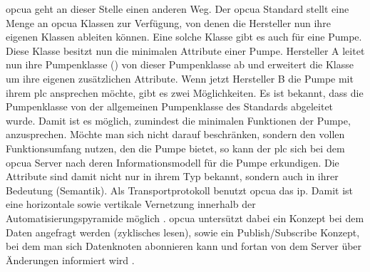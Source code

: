 \ac{opcua} geht an dieser Stelle einen anderen Weg. 
Der \ac{opcua} Standard stellt eine Menge an \ac{opcua} Klassen zur Verfügung, 
von denen die Hersteller nun ihre eigenen Klassen ableiten können.
Eine solche Klasse gibt es auch für eine Pumpe. Diese Klasse besitzt nun die minimalen Attribute einer Pumpe.
Hersteller A leitet nun ihre Pumpenklasse () von dieser Pumpenklasse ab und erweitert die Klasse um ihre eigenen zusätzlichen Attribute.
Wenn jetzt Hersteller B die Pumpe mit ihrem \ac{plc} ansprechen möchte, gibt es zwei Möglichkeiten.
Es ist bekannt, dass die Pumpenklasse  von der allgemeinen Pumpenklasse des Standards abgeleitet wurde.
Damit ist es möglich, zumindest die minimalen Funktionen der Pumpe, anzusprechen. 
Möchte man sich nicht darauf beschränken, sondern den vollen Funktionsumfang nutzen, den die Pumpe bietet, 
so kann der \ac{plc} sich bei dem \ac{opcua} Server nach deren Informationsmodell für die Pumpe erkundigen.
Die Attribute sind damit nicht nur in ihrem Typ bekannt, sondern auch in ihrer Bedeutung (Semantik).
Als Transportprotokoll benutzt \ac{opcua} das \ac{ip}. 
Damit ist eine horizontale sowie vertikale Vernetzung innerhalb der Automatisierungspyramide möglich \citep{opcua:2018}.
\ac{opcua} untersützt dabei ein Konzept bei dem Daten angefragt werden (zyklisches lesen), sowie ein Publish/Subscribe Konzept, 
bei dem man sich Datenknoten abonnieren kann und fortan von dem Server über Änderungen informiert wird \citep{opcua:2018}.

